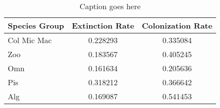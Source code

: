 
\begin{table}
   \centering
   \begin{tabular}{lcc}
Species Group& Extinction Rate& Colonization Rate\\
\hline
{ Col Mic Mac  }& 0.228293& 0.335084\\
{ Zoo  }& 0.183567& 0.405245\\
{ Omn  }& 0.161634& 0.205636\\
{ Pis  }& 0.318212& 0.366642\\
{ Alg  }& 0.169087& 0.541453\\
   \end{tabular}
   \caption{Caption goes here}
   \label{tab:myfirsttable}
\end{table}

